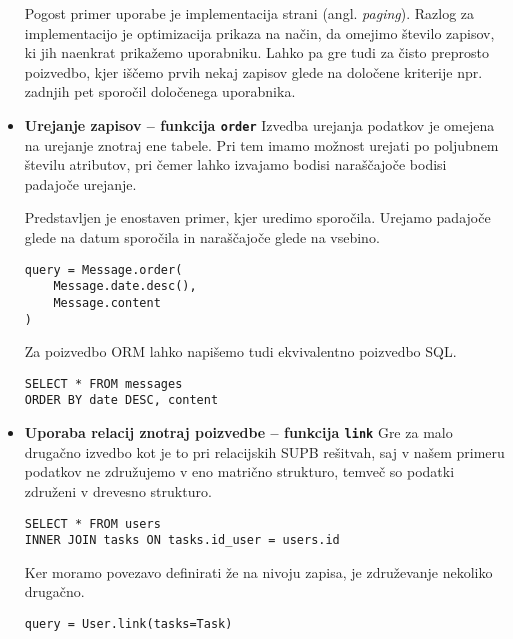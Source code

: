 \documentclass[a4paper,12pt,openright]{book}
\begin{document}
\begin{itemize}
        Pogost primer uporabe je implementacija strani (angl. \textit{paging}). Razlog za implementacijo je optimizacija prikaza na način, da omejimo število zapisov, ki jih naenkrat prikažemo uporabniku. Lahko pa gre tudi za čisto preprosto poizvedbo, kjer iščemo prvih nekaj zapisov glede na določene kriterije npr. zadnjih pet sporočil določenega uporabnika.
        
        \item \textbf{Urejanje zapisov – funkcija {\tt order}} 
        \newline
        \noindent
        Izvedba urejanja podatkov je omejena na urejanje znotraj ene tabele. Pri tem imamo možnost urejati po poljubnem številu atributov, pri čemer lahko izvajamo bodisi naraščajoče bodisi padajoče urejanje.

        Predstavljen je enostaven primer, kjer uredimo sporočila. Urejamo padajoče glede na datum sporočila in naraščajoče glede na vsebino.

\begin{verbatim}
query = Message.order(
    Message.date.desc(),
    Message.content
)
\end{verbatim}    

        \noindent
        Za poizvedbo ORM lahko napišemo tudi ekvivalentno poizvedbo SQL.

\begin{verbatim}
SELECT * FROM messages
ORDER BY date DESC, content
\end{verbatim}          

        \item \textbf{Uporaba relacij znotraj poizvedbe – funkcija {\tt link}}
        \newline
        \noindent
        Gre za malo drugačno izvedbo kot je to pri relacijskih SUPB rešitvah, saj v našem primeru podatkov ne združujemo v eno matrično strukturo, temveč so podatki združeni v drevesno strukturo.

\begin{verbatim}
SELECT * FROM users
INNER JOIN tasks ON tasks.id_user = users.id
\end{verbatim}

        \noindent
        Ker moramo povezavo definirati že na nivoju zapisa, je združevanje nekoliko drugačno.

\begin{verbatim}
query = User.link(tasks=Task)
\end{verbatim}


\end{itemize}
\end{document}
